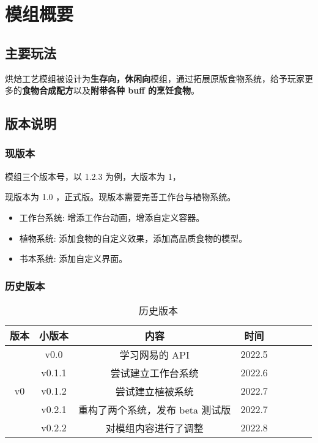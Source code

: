 \section{模组概要}
\subsection{主要玩法}

烘焙工艺模组被设计为\textbf{生存向，休闲向}模组，通过拓展原版食物系统，给予玩家更多的\textbf{食物合成配方}以及\textbf{附带各种 buff 的烹饪食物}。

\subsection{版本说明}

\subsubsection*{现版本}

模组三个版本号，以 1.2.3 为例，大版本为 1，

现版本为 1.0 ，正式版。现版本需要完善工作台与植物系统。
\begin{itemize}
    \item 工作台系统: 增添工作台动画，增添自定义容器。
    \item 植物系统: 添加食物的自定义效果，添加高品质食物的模型。
    \item 书本系统: 添加自定义界面。
\end{itemize}

\subsubsection*{历史版本}

\begin{table}[H]
    \centering
    \caption{历史版本}
    \label{table:历史版本}
    \setlength{\tabcolsep}{4mm}
    \begin{tabular}{c|c|c|ccccc}
        \toprule
        \textbf{版本} & \textbf{小版本} & \textbf{内容} & \textbf{时间} \\
        \midrule
        \multirow{5}{*}{v0} & v0.0 & 学习网易的 API & 2022.5 \\
         & v0.1.1 & 尝试建立工作台系统 & 2022.6 \\
         & v0.1.2 & 尝试建立植被系统 & 2022.7 \\
         & v0.2.1 & 重构了两个系统，发布 beta 测试版 & 2022.7 \\
         & v0.2.2 & 对模组内容进行了调整 & 2022.8 \\
        \bottomrule
    \end{tabular}
\end{table}

